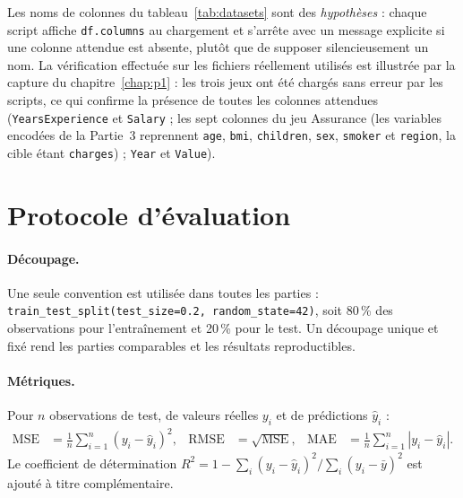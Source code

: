 \documentclass[11pt,a4paper]{report}
\begin{document}
Les noms de colonnes du tableau~\ref{tab:datasets} sont des \emph{hypoth\`eses} : chaque
script affiche \texttt{df.columns} au chargement et s'arr\^ete avec un message explicite
si une colonne attendue est absente, plut\^ot que de supposer silencieusement un nom.
La vérification effectuée sur les fichiers réellement utilisés est illustrée par la capture du chapitre~\ref{chap:p1} : les trois jeux ont été chargés sans erreur par les scripts, ce qui confirme la présence de toutes les colonnes attendues (\texttt{YearsExperience} et \texttt{Salary} ; les sept colonnes du jeu Assurance (les variables encodées de la Partie~3 reprennent \texttt{age}, \texttt{bmi}, \texttt{children}, \texttt{sex}, \texttt{smoker} et \texttt{region}, la cible étant \texttt{charges}) ; \texttt{Year} et \texttt{Value}).

\section{Protocole d'\'evaluation}

\paragraph{D\'ecoupage.} Une seule convention est utilis\'ee dans toutes les parties :
\texttt{train\_\allowbreak test\_\allowbreak split(test\_\allowbreak size=0.2, random\_\allowbreak state=42)}, soit 80\,\% des
observations pour l'entra\^inement et 20\,\% pour le test. Un d\'ecoupage unique et fix\'e
rend les parties comparables et les r\'esultats reproductibles.

\paragraph{M\'etriques.} Pour $n$ observations de test, de valeurs r\'eelles $y_i$ et de
pr\'edictions $\hat{y}_i$ :
\begin{align*}
  \mathrm{MSE}  &= \frac{1}{n}\sum_{i=1}^{n}\left(y_i-\hat{y}_i\right)^2, &
  \mathrm{RMSE} &= \sqrt{\mathrm{MSE}}, &
  \mathrm{MAE}  &= \frac{1}{n}\sum_{i=1}^{n}\left|y_i-\hat{y}_i\right|.
\end{align*}
Le coefficient de d\'etermination $R^2 = 1 - \sum_i (y_i-\hat{y}_i)^2 / \sum_i (y_i-\bar{y})^2$
est ajout\'e \`a titre compl\'ementaire.
\end{document}
